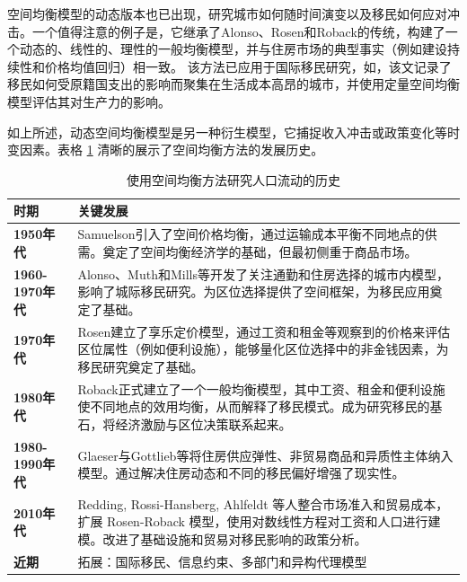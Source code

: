 \documentclass[a4paper, zihao=-4, fontset = mac, oneside]{ctexbook} %
\begin{document}
空间均衡模型的动态版本也已出现，研究城市如何随时间演变以及移民如何应对冲击。一个值得注意的例子是\textcite{glaeserHousingDynamicsUrban2014}，它继承了Alonso、Rosen和Roback的传统，构建了一个动态的、线性的、理性的一般均衡模型，并与住房市场的典型事实（例如建设持续性和价格均值回归）相一致。
该方法已应用于国际移民研究，如\textcite{albertImmigrationSpatialEquilibrium2022}，该文记录了移民如何受原籍国支出的影响而聚集在生活成本高昂的城市，并使用定量空间均衡模型评估其对生产力的影响。

如上所述，动态空间均衡模型是另一种衍生模型，它捕捉收入冲击或政策变化等时变因素。表格 \ref{tab:_history of spatial equilibrium on migratory problem} 清晰的展示了空间均衡方法的发展历史。

\begin{table}[!ht]
\centering
\caption{使用空间均衡方法研究人口流动的历史}
\label{tab:_history of spatial equilibrium on migratory problem}
\begin{tabularx}{\textwidth}{@{}lX@{}}
\toprule
\textbf{时期} & \textbf{关键发展}\\
\midrule
\textbf{1950年代} & Samuelson引入了空间价格均衡，通过运输成本平衡不同地点的供需。奠定了空间均衡经济学的基础，但最初侧重于商品市场。\\
\textbf{1960-1970年代} & Alonso、Muth和Mills等开发了关注通勤和住房选择的城市内模型，影响了城际移民研究。为区位选择提供了空间框架，为移民应用奠定了基础。\\
\textbf{1970年代} & Rosen建立了享乐定价模型，通过工资和租金等观察到的价格来评估区位属性（例如便利设施），能够量化区位选择中的非金钱因素，为移民研究奠定了基础。 \\
\textbf{1980年代} & Roback正式建立了一个一般均衡模型，其中工资、租金和便利设施使不同地点的效用均衡，从而解释了移民模式。成为研究移民的基石，将经济激励与区位决策联系起来。\\
\textbf{1980-1990年代} & Glaeser与Gottlieb等将住房供应弹性、非贸易商品和异质性主体纳入模型。通过解决住房动态和不同的移民偏好增强了现实性。\\
\textbf{2010年代} & Redding, Rossi-Hansberg, Ahlfeldt 等人整合市场准入和贸易成本，扩展 Rosen-Roback 模型，使用对数线性方程对工资和人口进行建模。改进了基础设施和贸易对移民影响的政策分析。\\
\textbf{近期} & 拓展：国际移民、信息约束、多部门和异构代理模型 \\
\bottomrule
\end{tabularx}
\end{table}
\end{document}

